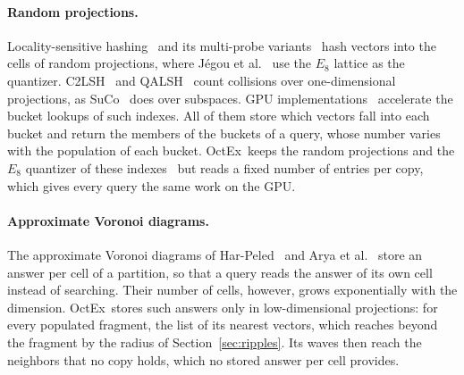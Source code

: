 \documentclass[letterpaper,twocolumn,10pt]{article}
\newcommand{\sysname}{OctEx}
\begin{document}
\paragraph{Random projections.} Locality-sensitive hashing~\cite{indyk1998ann,datar2004lsh,andoni2008nearoptimal} and its multi-probe variants~\cite{lv2007multiprobe} hash vectors into the cells of random projections, where Jégou et al.~\cite{jegou2008qalsh} use the $E_8$ lattice as the quantizer. C2LSH~\cite{gan2012c2lsh} and QALSH~\cite{huang2015qalsh} count collisions over one-dimensional projections, as SuCo~\cite{suco2025} does over subspaces. GPU implementations~\cite{pan2011gpulsh,wang2018flash} accelerate the bucket lookups of such indexes. All of them store which vectors fall into each bucket and return the members of the buckets of a query, whose number varies with the population of each bucket. \sysname\ keeps the random projections and the $E_8$ quantizer of these indexes~\cite{jegou2008qalsh} but reads a fixed number of entries per copy, which gives every query the same work on the GPU.

\paragraph{Approximate Voronoi diagrams.} The approximate Voronoi diagrams of Har-Peled~\cite{harpeled2001avd} and Arya et al.~\cite{arya2009spacetime} store an answer per cell of a partition, so that a query reads the answer of its own cell instead of searching. Their number of cells, however, grows exponentially with the dimension. \sysname\ stores such answers only in low-dimensional projections: for every populated fragment, the list of its nearest vectors, which reaches beyond the fragment by the radius of Section~\ref{sec:ripples}. Its waves then reach the neighbors that no copy holds, which no stored answer per cell provides.
\end{document}

